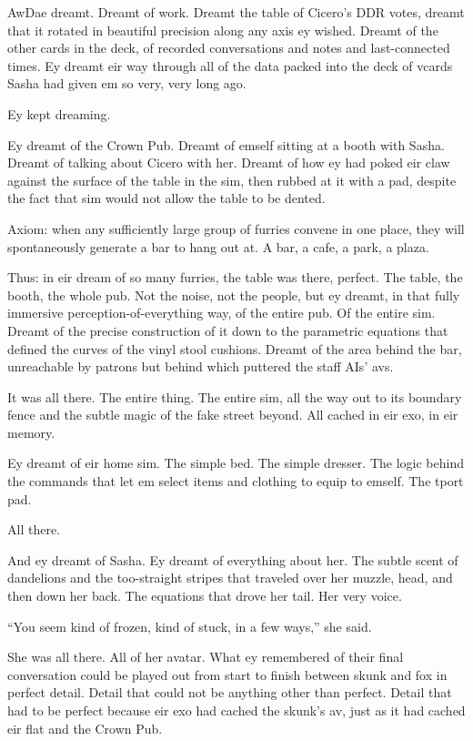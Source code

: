 AwDae dreamt. Dreamt of work. Dreamt the table of Cicero's DDR votes, dreamt that it rotated in beautiful precision along any axis ey wished. Dreamt of the other cards in the deck, of recorded conversations and notes and last-connected times. Ey dreamt eir way through all of the data packed into the deck of vcards Sasha had given em so very, very long ago.

Ey kept dreaming.

Ey dreamt of the Crown Pub. Dreamt of emself sitting at a booth with Sasha. Dreamt of talking about Cicero with her. Dreamt of how ey had poked eir claw against the surface of the table in the sim, then rubbed at it with a pad, despite the fact that sim would not allow the table to be dented.

Axiom: when any sufficiently large group of furries convene in one place, they will spontaneously generate a bar to hang out at. A bar, a cafe, a park, a plaza.

Thus: in eir dream of so many furries, the table was there, perfect. The table, the booth, the whole pub. Not the noise, not the people, but ey dreamt, in that fully immersive perception-of-everything way, of the entire pub. Of the entire sim. Dreamt of the precise construction of it down to the parametric equations that defined the curves of the vinyl stool cushions. Dreamt of the area behind the bar, unreachable by patrons but behind which puttered the staff AIs' avs.

It was all there. The entire thing. The entire sim, all the way out to its boundary fence and the subtle magic of the fake street beyond. All cached in eir exo, in eir memory.

Ey dreamt of eir home sim. The simple bed. The simple dresser. The logic behind the commands that let em select items and clothing to equip to emself. The tport pad.

All there.

And ey dreamt of Sasha. Ey dreamt of everything about her. The subtle scent of dandelions and the too-straight stripes that traveled over her muzzle, head, and then down her back. The equations that drove her tail. Her very voice.

``You seem kind of frozen, kind of stuck, in a few ways,'' she said.

She was all there. All of her avatar. What ey remembered of their final conversation could be played out from start to finish between skunk and fox in perfect detail. Detail that could not be anything other than perfect. Detail that had to be perfect because eir exo had cached the skunk's av, just as it had cached eir flat and the Crown Pub.

